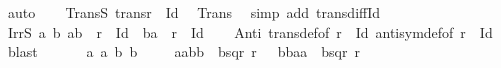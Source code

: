 \begin{isabellebody}
\ auto\isanewline
\ \ \isamarkupfalse%
\ TransS{\isacharcolon}{\kern0pt}\ {\isachardoublequoteopen}trans{\isacharparenleft}{\kern0pt}r\ {\isacharminus}{\kern0pt}\ Id{\isacharparenright}{\kern0pt}{\isachardoublequoteclose}\ \isamarkupfalse%
\ Trans\ \isamarkupfalse%
\ {\isacharparenleft}{\kern0pt}simp\ add{\isacharcolon}{\kern0pt}\ trans{\isacharunderscore}{\kern0pt}diff{\isacharunderscore}{\kern0pt}Id{\isacharparenright}{\kern0pt}\isanewline
\ \ \isamarkupfalse%
\ IrrS{\isacharcolon}{\kern0pt}\ {\isachardoublequoteopen}{\isasymforall}a\ b{\isachardot}{\kern0pt}\ {\isasymnot}{\isacharparenleft}{\kern0pt}{\isacharparenleft}{\kern0pt}a{\isacharcomma}{\kern0pt}b{\isacharparenright}{\kern0pt}\ {\isasymin}\ r\ {\isacharminus}{\kern0pt}\ Id\ {\isasymand}\ {\isacharparenleft}{\kern0pt}b{\isacharcomma}{\kern0pt}a{\isacharparenright}{\kern0pt}\ {\isasymin}\ r\ {\isacharminus}{\kern0pt}\ Id{\isacharparenright}{\kern0pt}{\isachardoublequoteclose}\isanewline
\ \ \isamarkupfalse%
\ Anti\ trans{\isacharunderscore}{\kern0pt}def{\isacharbrackleft}{\kern0pt}of\ {\isachardoublequoteopen}r\ {\isacharminus}{\kern0pt}\ Id{\isachardoublequoteclose}{\isacharbrackright}{\kern0pt}\ antisym{\isacharunderscore}{\kern0pt}def{\isacharbrackleft}{\kern0pt}of\ {\isachardoublequoteopen}r\ {\isacharminus}{\kern0pt}\ Id{\isachardoublequoteclose}{\isacharbrackright}{\kern0pt}\ \isamarkupfalse%
\ blast\isanewline
\ \ \isanewline
\ \ \isamarkupfalse%
\ a{}\ a{}\ b{}\ b{}\isanewline
\ \ \isamarkupfalse%
\ {\isacharasterisk}{\kern0pt}{\isacharcolon}{\kern0pt}\ {\isachardoublequoteopen}{\isacharparenleft}{\kern0pt}{\isacharparenleft}{\kern0pt}a{}{\isacharcomma}{\kern0pt}a{}{\isacharparenright}{\kern0pt}{\isacharcomma}{\kern0pt}{\isacharparenleft}{\kern0pt}b{}{\isacharcomma}{\kern0pt}b{}{\isacharparenright}{\kern0pt}{\isacharparenright}{\kern0pt}\ {\isasymin}\ bsqr\ r{\isachardoublequoteclose}\ \ {\isacharasterisk}{\kern0pt}{\isacharasterisk}{\kern0pt}{\isacharcolon}{\kern0pt}\ {\isachardoublequoteopen}{\isacharparenleft}{\kern0pt}{\isacharparenleft}{\kern0pt}b{}{\isacharcomma}{\kern0pt}b{}{\isacharparenright}{\kern0pt}{\isacharcomma}{\kern0pt}{\isacharparenleft}{\kern0pt}a{}{\isacharcomma}{\kern0pt}a{}{\isacharparenright}{\kern0pt}{\isacharparenright}{\kern0pt}\ {\isasymin}\ bsqr\ r{\isachardoublequoteclose}\isanewline

\end{isabellebody}
